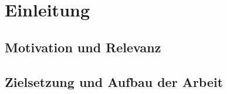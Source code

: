 \chapter{Einleitung}
\label{cap:Einleitung}

\section{Motivation und Relevanz}
\label{sec:Motivation}

\section{Zielsetzung und Aufbau der Arbeit}
\label{sec:Zielsetzung}

